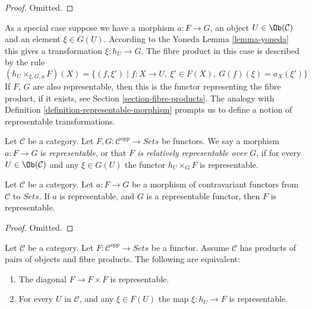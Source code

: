 \begin{proof}
Omitted.
\end{proof}

\noindent
As a special case suppose we have a morphism
$a : F \to G$, an object $U \in \Ob(\mathcal{C})$
and an element $\xi \in G(U)$. According to the Yoneda
Lemma \ref{lemma-yoneda} this gives a transformation
$\xi : h_U \to G$. The fibre product in this case
is described by the rule
$$
(h_U \times_{\xi, G, a} F)(X) =
\{ (f, \xi') \mid f : X \to U, \ \xi' \in F(X), \ G(f)(\xi) = a_X(\xi')\}
$$
If $F$, $G$ are also representable, then this is the functor representing the
fibre product, if it exists, see Section \ref{section-fibre-products}.
The analogy with Definition \ref{definition-representable-morphism}
prompts us to define a notion
of representable transformations.

\begin{definition}
\label{definition-representable-map-presheaves}
Let $\mathcal{C}$ be a category.
Let $F, G : \mathcal{C}^{opp} \to \textit{Sets}$
be functors. We say a morphism $a : F \to G$ is
{\it representable}, or that {\it $F$ is relatively representable
over $G$}, if for every $U \in \Ob(\mathcal{C})$
and any $\xi \in G(U)$ the functor
$h_U \times_G F$ is representable.
\end{definition}

\begin{lemma}
\label{lemma-representable-over-representable}
Let $\mathcal{C}$ be a category.
Let $a : F \to G$ be a morphism of contravariant functors
from $\mathcal{C}$ to $\textit{Sets}$. If $a$ is representable,
and $G$ is a representable functor, then $F$ is representable.
\end{lemma}

\begin{proof}
Omitted.
\end{proof}

\begin{lemma}
\label{lemma-representable-diagonal}
Let $\mathcal{C}$ be a category.
Let $F : \mathcal{C}^{opp} \to \textit{Sets}$ be a functor.
Assume $\mathcal{C}$ has products of pairs of objects and fibre products.
The following are equivalent:
\begin{enumerate}
\item The diagonal $F \to F \times F$ is representable.
\item For every $U$ in $\mathcal{C}$,
and any $\xi \in F(U)$ the map $\xi : h_U \to F$ is representable.
\end{enumerate}
\end{lemma}


